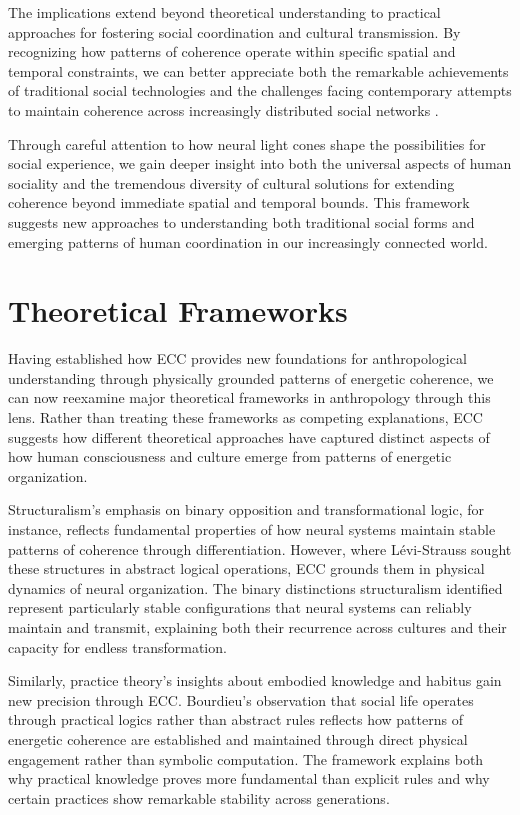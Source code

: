 \begin{refsection}
The implications extend beyond theoretical understanding to practical approaches for fostering social coordination and cultural transmission. By recognizing how patterns of coherence operate within specific spatial and temporal constraints, we can better appreciate both the remarkable achievements of traditional social technologies and the challenges facing contemporary attempts to maintain coherence across increasingly distributed social networks \cite{hutchins1995cognition}.

Through careful attention to how neural light cones shape the possibilities for social experience, we gain deeper insight into both the universal aspects of human sociality and the tremendous diversity of cultural solutions for extending coherence beyond immediate spatial and temporal bounds. This framework suggests new approaches to understanding both traditional social forms and emerging patterns of human coordination in our increasingly connected world.

\section{Theoretical Frameworks}

Having established how ECC provides new foundations for anthropological understanding through physically grounded patterns of energetic coherence, we can now reexamine major theoretical frameworks in anthropology through this lens. Rather than treating these frameworks as competing explanations, ECC suggests how different theoretical approaches have captured distinct aspects of how human consciousness and culture emerge from patterns of energetic organization.

Structuralism's emphasis on binary opposition and transformational logic, for instance, reflects fundamental properties of how neural systems maintain stable patterns of coherence through differentiation. However, where Lévi-Strauss sought these structures in abstract logical operations, ECC grounds them in physical dynamics of neural organization. The binary distinctions structuralism identified represent particularly stable configurations that neural systems can reliably maintain and transmit, explaining both their recurrence across cultures and their capacity for endless transformation.

Similarly, practice theory's insights about embodied knowledge and habitus gain new precision through ECC. Bourdieu's observation that social life operates through practical logics rather than abstract rules reflects how patterns of energetic coherence are established and maintained through direct physical engagement rather than symbolic computation. The framework explains both why practical knowledge proves more fundamental than explicit rules and why certain practices show remarkable stability across generations.


\end{refsection}
